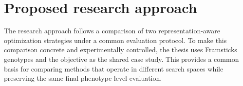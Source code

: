 \section{Proposed research approach}






The research approach follows a comparison of two representation-aware optimization strategies under a common evaluation protocol. To make this comparison concrete and experimentally controlled, the thesis uses Framsticks \fone{} genotypes and the \vertpos{} objective as the shared case study. This provides a common basis for comparing methods that operate in different search spaces while preserving the same final phenotype-level evaluation.

